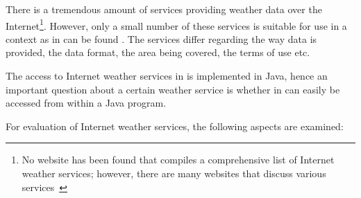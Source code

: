 There is a tremendous amount of services providing weather data over the Internet\footnote{No website has been found that compiles a comprehensive list of Internet weather services; however, there are many websites that discuss various services~\cite{WeatherServices1,WeatherServices2,WeatherServices3}}. However, only a small number of these services is suitable for use in a context as in can be found \thinkhome. The services differ regarding the way data is provided, the data format, the area being covered, the terms of use etc.

The access to Internet weather services in \thinkhome is implemented in Java, hence an important question about a certain weather service is whether in can easily be accessed from within a Java program.

For evaluation of Internet weather services, the following aspects are examined:

